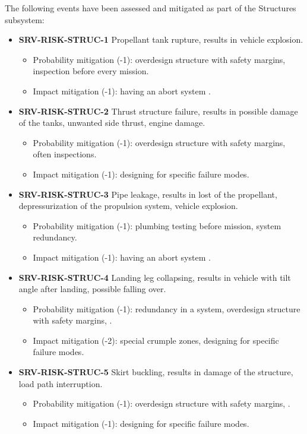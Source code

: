 \noindent The following events have been assessed and mitigated as part of the Structures subsystem:

\begin{itemize}
	 \item \textbf{SRV-RISK-STRUC-1} Propellant tank rupture, results in vehicle explosion.
	\begin{itemize}
		 \item Probability mitigation (-1): overdesign structure with safety margins, inspection before every mission.		 \item Impact mitigation (-1): having an abort system .	\end{itemize}
	 \item \textbf{SRV-RISK-STRUC-2} Thrust structure failure, results in possible damage of the tanks, unwanted side thrust, engine damage.
	\begin{itemize}
		 \item Probability mitigation (-1): overdesign structure with safety margins, often inspections.		 \item Impact mitigation (-1): designing for specific failure modes.	\end{itemize}
	 \item \textbf{SRV-RISK-STRUC-3} Pipe leakage, results in lost of the propellant, depressurization of the propulsion system, vehicle explosion.
	\begin{itemize}
		 \item Probability mitigation (-1): plumbing testing before mission, system redundancy.		 \item Impact mitigation (-1): having an abort system .	\end{itemize}
	 \item \textbf{SRV-RISK-STRUC-4} Landing leg collapsing, results in vehicle with tilt angle after landing, possible falling over.
	\begin{itemize}
		 \item Probability mitigation (-1): redundancy in a system, overdesign structure with safety margins, .		 \item Impact mitigation (-2): special crumple zones, designing for specific failure modes.	\end{itemize}
	 \item \textbf{SRV-RISK-STRUC-5} Skirt buckling, results in damage of the structure, load path interruption.
	\begin{itemize}
		 \item Probability mitigation (-1): overdesign structure with safety margins, .		 \item Impact mitigation (-1): designing for specific failure modes.	\end{itemize}

\end{itemize}
